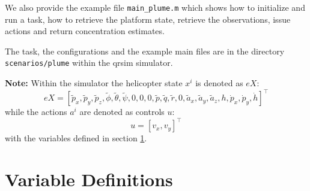 \documentclass[a4paper,11pt]{report}
\newcommand\mytexttt[1]{\texttt{\hyphenchar\font=45\relax #1}}
\begin{document}
We also provide the example file \texttt{main\_plume.m} which shows how to initialize and run a task, how to retrieve the platform state, retrieve the observations, issue actions and return concentration estimates.

The task, the configurations and the example main files are in the directory \mytexttt{scenarios/plume} within the qrsim simulator. 

\textbf{Note:}
Within the simulator the helicopter state $x^i$ is denoted as $eX$:
$$eX = [\tilde{p}_x,\tilde{p}_y,\tilde{p}_z,\tilde{\phi},\tilde{\theta},\tilde{\psi},0,0,0,\tilde{p},\tilde{q},\tilde{r},0,\tilde{a}_x,\tilde{a}_y,\tilde{a}_z,h,\dot{p}_x,\dot{p}_y,\dot{h}]^\intercal$$
while the actions $a^i$ are denoted as controls $u$:
$$u=[v_x,v_y]^\intercal$$
with the variables defined in section \ref{tab:naming}.

\newpage

\appendix

\chapter{Variable Definitions}\label{tab:naming}
\end{document}
